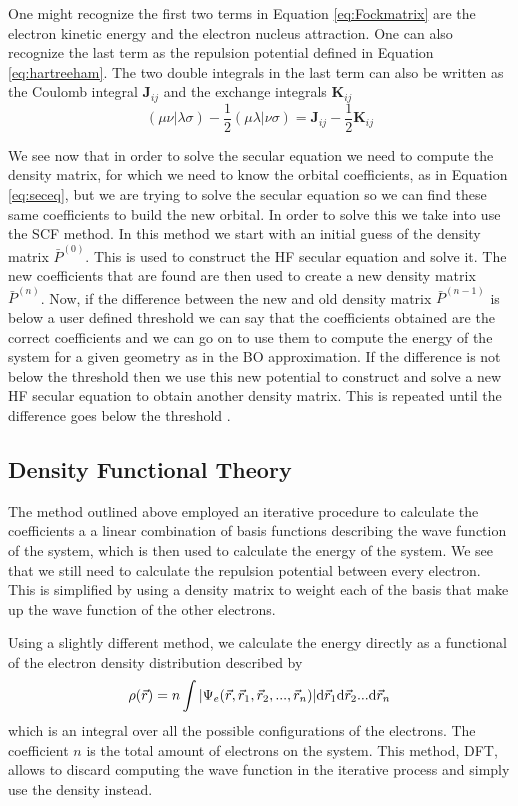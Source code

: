 \documentclass[../master_thesis.tex]{subfiles}
\begin{document}
One might recognize the first two terms in  Equation \ref{eq:Fockmatrix} are
the electron kinetic energy and the electron nucleus attraction. One can also recognize the
last term as the repulsion potential defined in Equation \ref{eq:hartreeham}.
The two double integrals in the last term can also be written as the Coulomb integral $\mathbf{J}_{ij}$
and the exchange integrals $\mathbf{K}_{ij}$ \cite{Cramer:2004}
\begin{equation}
  (\mu\nu|\lambda\sigma) - \frac{1}{2}(\mu\lambda|\nu\sigma) = \mathbf{J}_{ij} - \frac{1}{2}\mathbf{K}_{ij}
\end{equation}

We see now that in order to solve the secular equation we need to compute the
density matrix, for which we need to know the orbital coefficients, as in Equation
\ref{eq:seceq}, but we  are trying to solve the secular equation so we can find
these same coefficients to build the new orbital.
In order to solve this we take into use the \ac{SCF} method. In this method
we start with an initial guess of the density matrix $\bar{P}^{(0)}$. This
is used to construct the \ac{HF} secular equation and solve it. The new coefficients
that are found are then used to create a new density matrix $\bar{P}^{(n)}$. Now, if
the difference between the new and old density matrix $ \bar{P}^{(n-1)}$ is below
a user defined threshold we can say that the coefficients obtained are the correct
coefficients and we can go on to use them to compute the energy of the system for
a given geometry as in the \ac{BO} approximation. If the difference
is not below the threshold then we use this new potential to construct and solve
a new \ac{HF} secular equation to obtain another density matrix. This is repeated
until the difference goes below the threshold \cite{Helgaker:2012, Cramer:2004}.


\subsection{Density Functional Theory}
The method outlined above employed an iterative procedure to calculate the coefficients
a a linear combination of basis functions describing the wave function of the
system, which is then used to calculate the energy of the system. We see that we
still need to calculate the repulsion potential between every electron. This is
simplified by using a density matrix to weight each of the basis that make up the
wave function of the other electrons.

Using a slightly different method, we calculate the energy directly as a functional
of the electron density distribution \cite{Sorland, Cramer:2004} described by
\begin{equation}\label{eq:densityintegral}
  \rho(\vec{r}) = n \int\abs{\Psi_e(\vec{r}, \vec{r}_1, \vec{r}_2,..., \vec{r}_n)} \text{d}\vec{r}_1\text{d}\vec{r}_2...\text{d}\vec{r}_n
\end{equation}
which is an integral over all the possible configurations of the electrons. The
coefficient $n$ is the total amount of electrons on the system. This method,
\ac{DFT}, allows to discard computing the wave function in the iterative process and
simply use the density instead.
\end{document}
